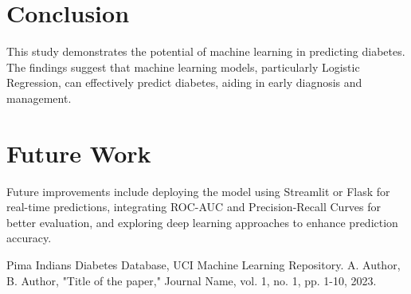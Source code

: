 \documentclass[conference]{IEEEtran}
\begin{document}
\section{Conclusion}
This study demonstrates the potential of machine learning in predicting diabetes. The findings suggest that machine learning models, particularly Logistic Regression, can effectively predict diabetes, aiding in early diagnosis and management.

\section{Future Work}
Future improvements include deploying the model using Streamlit or Flask for real-time predictions, integrating ROC-AUC and Precision-Recall Curves for better evaluation, and exploring deep learning approaches to enhance prediction accuracy.

\begin{thebibliography}{1}
 Pima Indians Diabetes Database, UCI Machine Learning Repository.
 A. Author, B. Author, "Title of the paper," Journal Name, vol. 1, no. 1, pp. 1-10, 2023.
\end{thebibliography}
\end{document}
